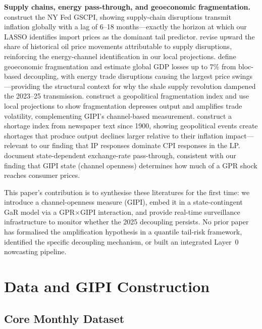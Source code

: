 \documentclass[12pt]{article}
\begin{document}
\noindent\textbf{Supply chains, energy pass-through, and geoeconomic fragmentation.}
\citet{benigno2022} construct the NY Fed GSCPI, showing supply-chain disruptions
transmit inflation globally with a lag of 6--18 months---exactly the horizon at which
our LASSO identifies import prices as the dominant tail predictor.
\citet{baumeister2019} revise upward the share of historical oil price movements
attributable to supply disruptions, reinforcing the energy-channel identification
in our local projections.
\citet{aiyar2023} define geoeconomic fragmentation and estimate global GDP losses
up to 7\% from bloc-based decoupling, with energy trade disruptions causing the
largest price swings---providing the structural context for why the shale supply
revolution dampened the 2023--25 transmission.
\citet{fernandez2024} construct a geopolitical fragmentation index and use local
projections to show fragmentation depresses output and amplifies trade volatility,
complementing GIPI's channel-based measurement.
\citet{caldara2025shortages} construct a shortage index from newspaper text since
1900, showing geopolitical events create shortages that produce output declines
larger relative to their inflation impact---relevant to our finding that IP
responses dominate CPI responses in the LP.
\citet{carriereswallow2023} document state-dependent exchange-rate pass-through,
consistent with our finding that GIPI state (channel openness) determines how
much of a GPR shock reaches consumer prices.

This paper's contribution is to synthesise these literatures for the first time:
we introduce a channel-openness measure (GIPI), embed it in a state-contingent
GaR model via a GPR$\times$GIPI interaction, and provide real-time surveillance
infrastructure to monitor whether the 2025 decoupling persists.
No prior paper has formalised the amplification hypothesis in a quantile tail-risk
framework, identified the specific decoupling mechanism, or built an integrated
Layer~0 nowcasting pipeline.

\section{Data and GIPI Construction}\label{sec:data}

\subsection{Core Monthly Dataset}
\end{document}
